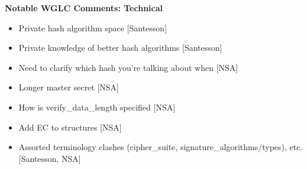 \documentclass[helvetica]{seminar}
\newcommand{\heading}[1]{%
  \begin{center} 
    \large\bf 
    #1 
  \end{center} 
  \vspace{.4 in}}
\begin{document}
\begin{slide}
\heading{Notable WGLC Comments: Technical}

\begin{itemize}
\item Private hash algorithm space [Santesson]
\item Private knowledge of better hash algorithms [Santesson]
\item Need to clarify which hash you're talking about when [NSA]
\item Longer master secret [NSA]
\item How is verify\_data\_length specified [NSA]
\item Add EC to structures [NSA]
\item Assorted terminology clashes (cipher\_suite, signature\_algorithms/types), etc. [Santesson, NSA]
\end{itemize}

\end{slide}
\end{document}
